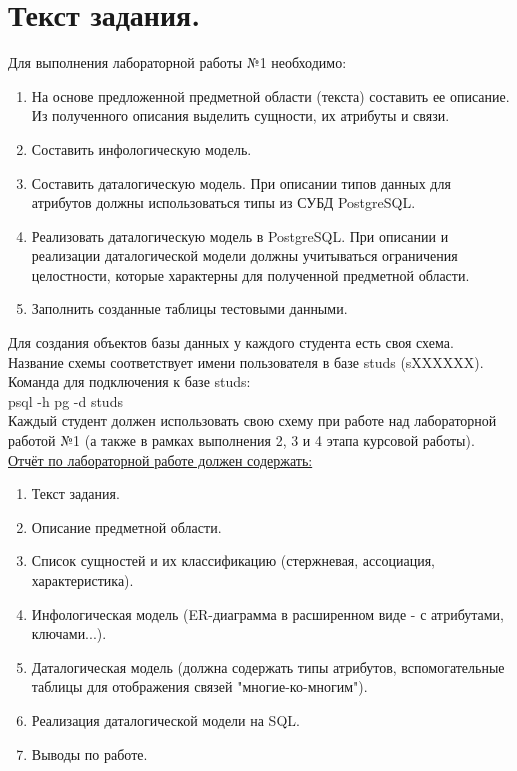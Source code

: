 \documentclass[12pt,onecolumn]{article}
\begin{document}
\section{Текст задания.}
Для выполнения лабораторной работы №1 необходимо:
\begin{enumerate}
  \item На основе предложенной предметной области (текста) составить ее описание. Из полученного описания выделить сущности, их атрибуты и связи.
  \item Составить инфологическую модель.
  \item Составить даталогическую модель. При описании типов данных для атрибутов должны использоваться типы из СУБД PostgreSQL.
  \item Реализовать даталогическую модель в PostgreSQL. При описании и реализации даталогической модели должны учитываться ограничения целостности, которые характерны для полученной предметной области.
  \item Заполнить созданные таблицы тестовыми данными.
\end{enumerate}
Для создания объектов базы данных у каждого студента есть своя схема. Название схемы соответствует имени пользователя в базе studs (sXXXXXX). Команда для подключения к базе studs:\\
psql -h pg -d studs \\
Каждый студент должен использовать свою схему при работе над лабораторной работой №1 (а также в рамках выполнения 2, 3 и 4 этапа курсовой работы).\\
\underline{Отчёт по лабораторной работе должен содержать:}
\begin{enumerate}
  \item Текст задания.
  \item Описание предметной области.
  \item Список сущностей и их классификацию (стержневая, ассоциация, характеристика).
  \item Инфологическая модель (ER-диаграмма в расширенном виде - с атрибутами, ключами...).
  \item Даталогическая модель (должна содержать типы атрибутов, вспомогательные таблицы для отображения связей "многие-ко-многим").
  \item Реализация даталогической модели на SQL.
  \item Выводы по работе.
\end{enumerate}
\end{document}
